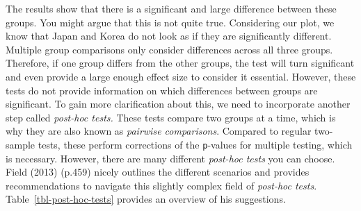 \documentclass[
  letterpaper,
]{krantz}
\begin{document}
The results show that there is a significant and large difference
between these groups. You might argue that this is not quite true.
Considering our plot, we know that Japan and Korea do not look as if
they are significantly different. Multiple group comparisons only
consider differences across all three groups. Therefore, if one group
differs from the other groups, the test will turn significant and even
provide a large enough effect size to consider it essential. However,
these tests do not provide information on which differences between
groups are significant. To gain more clarification about this, we need
to incorporate another step called \emph{post-hoc tests.} These tests
compare two groups at a time, which is why they are also known as
\emph{pairwise comparisons}. Compared to regular two-sample tests, these
perform corrections of the \texttt{p}-values for multiple testing, which
is necessary. However, there are many different \emph{post-hoc tests}
you can choose. Field (2013) (p.459) nicely outlines the different
scenarios and provides recommendations to navigate this slightly complex
field of \emph{post-hoc tests}. Table~\ref{tbl-post-hoc-tests} provides
an overview of his suggestions.
\end{document}
